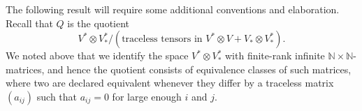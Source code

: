 \documentclass[11pt]{article}
\theoremstyle{plain}
\theoremstyle{nonumberplain}
\theoremstyle{plain}
\numberwithin{equation}{section}
\theoremstyle{nonumberplain}
\newcommand\fG{{\mathfrak G}}
\newcommand\1{{\bf 1}}
\begin{document}


The following result will require some additional conventions and elaboration. Recall that $Q$ is the quotient
  \begin{equation*}
    V^*\otimes V^*_*/(\text{traceless tensors in }V^*\otimes V + V_* \otimes   V^*_*).
  \end{equation*}
  We noted above that we identify the space $ V^*\otimes V^*_*$ with finite-rank infinite $\mathbb{N}\times \mathbb{N}$-matrices, and hence the quotient consists of equivalence classes of such matrices, where two are declared equivalent whenever they differ by a traceless matrix $(a_{ij})$ such that $a_{ij}=0$ for large enough $i$ and $j$. %
\end{document}
